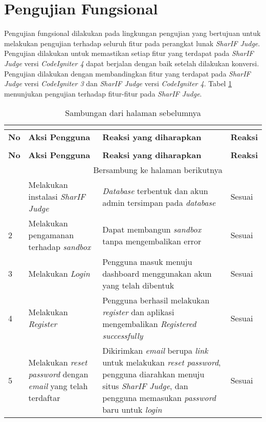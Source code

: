 \section{Pengujian Fungsional}
Pengujian fungsional dilakukan pada lingkungan pengujian yang bertujuan untuk melakukan pengujian terhadap seluruh fitur pada perangkat lunak \textit{SharIF Judge}. Pengujian dilakukan untuk memastikan setiap fitur yang terdapat pada \textit{SharIF Judge} versi \textit{CodeIgniter 4} dapat berjalan dengan baik setelah dilakukan konversi. Pengujian dilakukan dengan membandingkan fitur yang terdapat pada \textit{SharIF Judge} versi \textit{CodeIgniter 3} dan \textit{SharIF Judge} versi \textit{CodeIgniter 4}. Tabel \ref{tab:fungsional} menunjukan pengujian terhadap fitur-fitur pada \textit{SharIF Judge}.

\begin{longtable}[H]{|p{0.5cm}| p{5.5cm}| p{6cm}| p{2.5cm}|}
\caption{Tabel Pengujian Fungsional}\\
\label{tab:fungsional}\\
\hline
\textbf{No} & \textbf{Aksi Pengguna} & \textbf{Reaksi yang diharapkan} & \textbf{Reaksi} \\
\hline
\endfirsthead
\caption{Sambungan dari halaman sebelumnya}\\
\hline
\textbf{No} & \textbf{Aksi Pengguna} & \textbf{Reaksi yang diharapkan} & \textbf{Reaksi} \\
\hline
\endhead
\hline
\multicolumn{3}{r}{Bersambung ke halaman berikutnya} \\
\endfoot
\hline
\endlastfoot
1 & Melakukan instalasi \textit{SharIF Judge} & \textit{Database} terbentuk dan akun admin tersimpan pada \textit{database} & Sesuai\\ \cline{1-4}
2 & Melakukan pengamanan terhadap \textit{sandbox} & Dapat membangun \textit{sandbox} tanpa mengembalikan error & Sesuai\\ \cline{1-4}
3 & Melakukan \textit{Login} & Pengguna masuk menuju dashboard menggunakan akun yang telah dibentuk & Sesuai\\ \cline{1-4}
4 & Melakukan \textit{Register} & Pengguna berhasil melakukan \textit{register} dan aplikasi mengembalikan \textit{Registered successfully} & Sesuai\\ \cline{1-4}
5 & Melakukan \textit{reset password} dengan \textit{email} yang telah terdaftar  & Dikirimkan \textit{email} berupa \textit{link} untuk melakukan \textit{reset password}, pengguna diarahkan menuju situs \textit{SharIF Judge}, dan pengguna memasukan \textit{password} baru untuk \textit{login} & Sesuai\\ \cline{1-4}

\end{longtable}
